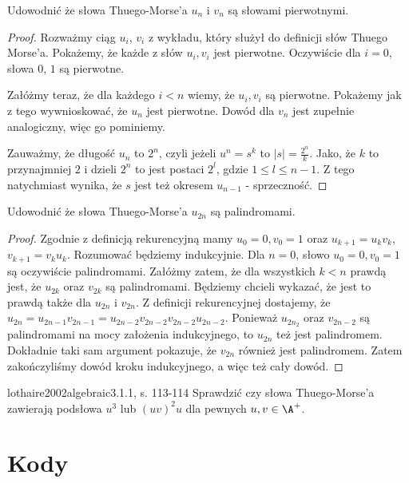 \begin{problem}{}{}
  Udowodnić że słowa Thuego-Morse'a $u_n$ i $v_n$ są słowami pierwotnymi.
\end{problem}

\begin{proof}
Rozważmy ciąg $u_i$, $v_i$ z wykładu, który służył do definicji słów Thuego Morse'a. Pokażemy, że każde z słów $u_i, v_i$ jest pierwotne.
Oczywiście dla $i=0$, słowa $0$, $1$ są pierwotne.

Załóżmy teraz, że dla każdego $i < n$ wiemy, że $u_i, v_i$ są pierwotne. Pokażemy jak z tego wywnioskować, że $u_n$ jest pierwotne. Dowód dla $v_n$ jest zupełnie analogiczny, więc go pominiemy.

Zauważmy, że długość $u_n$ to $2^n$, czyli jeżeli $u^n = s^k$ to $|s| = \frac{2^n}{k}$. Jako, że $k$ to przynajmniej $2$ i dzieli $2^n$ to jest postaci $2^l$, gdzie $1 \leq l \leq n-1$. Z tego natychmiast wynika, że $s$ jest też okresem $u_{n-1}$ - sprzeczność.
\end{proof}

\begin{problem}{}{}
  Udowodnić że słowa Thuego-Morse'a $u_{2n}$ są palindromami.
\end{problem}

\begin{proof}
Zgodnie z definicją rekurencyjną mamy $u_0=0,v_0=1$ oraz $u_{k+1}=u_kv_k$, $v_{k+1}=v_ku_k$. Rozumować będziemy indukcyjnie. Dla $n=0$, słowo $u_0=0, v_0=1$ są oczywiście palindromami. Załóżmy zatem, że dla wszystkich $k < n$ prawdą jest, że $u_{2k}$ oraz $v_{2k}$ są palindromami. Będziemy chcieli wykazać, że jest to prawdą także dla $u_{2n}$ i $v_{2n}$. Z definicji rekurencyjnej dostajemy, że $u_{2n}=u_{2n-1}v_{2n-1}=u_{2n-2}v_{2n-2}v_{2n-2}u_{2n-2}$. Ponieważ $u_{2n_2}$ oraz $v_{2n-2}$ są palindromami na mocy założenia indukcyjnego, to $u_{2n}$ też jest palindromem. Dokładnie taki sam argument pokazuje, że $v_{2n}$ również jest palindromem. Zatem zakończyliśmy dowód kroku indukcyjnego, a więc też cały dowód.
\end{proof}

\begin{problem}{lothaire2002algebraic}{3.1.1, s. 113-114}
  Sprawdzić czy słowa Thuego-Morse'a zawierają podsłowa $u^3$ lub $(uv)^2u$ dla pewnych $u, v \in \A^+$.
\end{problem}

\section{Kody}

